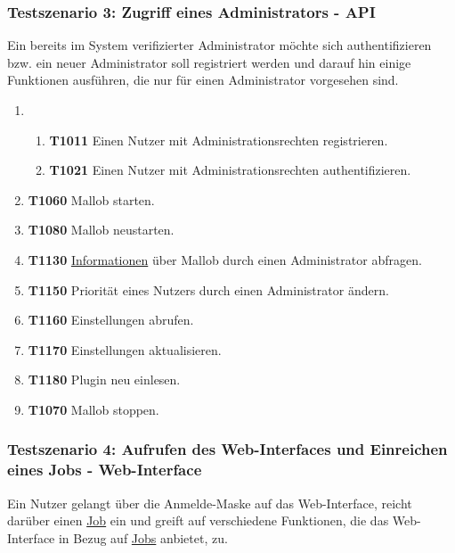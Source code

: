 \subsubsection{Testszenario 3: Zugriff eines Administrators - API}
Ein bereits im System verifizierter \gls{Administrator} möchte sich authentifizieren bzw. ein neuer \gls{Administrator} soll registriert werden und darauf hin einige Funktionen ausführen, die nur für einen \gls{Administrator} vorgesehen sind.

\begin{enumerate}
    \item
    \begin{enumerate}
        \item \textbf{T1011} Einen \gls{Nutzer} mit Administrationsrechten registrieren.
        
        \item \textbf{T1021} Einen \gls{Nutzer} mit Administrationsrechten authentifizieren. 
    \end{enumerate}
    
    \item \textbf{T1060} Mallob starten.
    
    \item \textbf{T1080} Mallob neustarten.
    
    \item \textbf{T1130} \hyperref[B:Job-Informationen]{Informationen} über Mallob durch einen \gls{Administrator} abfragen. 
    
    \item \textbf{T1150} Priorität eines Nutzers durch einen \gls{Administrator} ändern. 
    
    \item \textbf{T1160} Einstellungen abrufen.
    
    \item \textbf{T1170} Einstellungen aktualisieren. 
    
    \item \textbf{T1180} Plugin neu einlesen.
    
    \item \textbf{T1070} Mallob stoppen. 
\end{enumerate}

\subsubsection{Testszenario 4: Aufrufen des Web-Interfaces und Einreichen eines Jobs - Web-Interface}
Ein \gls{Nutzer} gelangt über die Anmelde-Maske auf das \gls{Web-Interface}, reicht darüber einen \hyperref[B:Jobs]{Job} ein und greift auf verschiedene Funktionen, die das \gls{Web-Interface} in Bezug auf \hyperref[B:Jobs]{Jobs} anbietet, zu.

